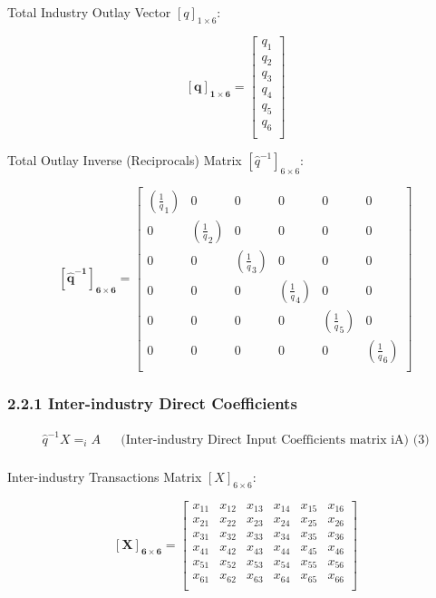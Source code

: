 \documentclass[
  letterpaper,
  DIV=11,
  numbers=noendperiod]{scrreprt}
\begin{document}
Total Industry Outlay Vector \([q]_{1\times 6}\):

\[\mathbf{[q]_{1\times 6}} = \left[\begin{array}
{rrr}
q_{1} \\
q_{2} \\
q_{3} \\
q_{4} \\
q_{5} \\
q_{6} \\
\end{array}\right]
\]

Total Outlay Inverse (Reciprocals) Matrix
\([\hat{q}^{-1}]_{6\times 6}\):

\[\mathbf {[\hat{q}^{-1}]_{6\times 6}} = \left[\begin{array}
{rrr}
(\frac{1} q_{1}) & 0 & 0 & 0 & 0 & 0 \\
0 & (\frac{1} q_{2}) & 0 & 0 & 0 & 0 \\
0 & 0 & (\frac{1} q_{3}) & 0 & 0 & 0 \\
0 & 0 & 0 & (\frac{1} q_{4}) & 0 & 0 \\
0 & 0 & 0 & 0 & (\frac{1} q_{5}) & 0 \\
0 & 0 & 0 & 0 & 0 & (\frac{1} q_{6}) \\
\end{array}\right]
\]

\subsubsection{2.2.1 Inter-industry Direct
Coefficients}\label{inter-industry-direct-coefficients}

\[
\begin{align}
    \hat{q}^{-1}X = _{i}A && \text{(Inter-industry Direct Input Coefficients matrix iA) (3)}\\
\end{align}
\]

Inter-industry Transactions Matrix \([X]_{6\times 6}\):

\[\mathbf{[X]_{6\times 6}} = \left[\begin{array}
{rrr}
x_{11} & x_{12} & x_{13} & x_{14} & x_{15} & x_{16} \\
x_{21} & x_{22} & x_{23} & x_{24} & x_{25} & x_{26} \\
x_{31} & x_{32} & x_{33} & x_{34} & x_{35} & x_{36} \\
x_{41} & x_{42} & x_{43} & x_{44} & x_{45} & x_{46} \\
x_{51} & x_{52} & x_{53} & x_{54} & x_{55} & x_{56} \\
x_{61} & x_{62} & x_{63} & x_{64} & x_{65} & x_{66} \\
\end{array}\right]
\]
\end{document}
